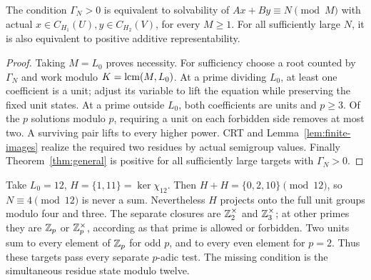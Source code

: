 \begin{theorem}\label{thm:local}
The condition \(\Gamma_N>0\) is equivalent to solvability of
\(Ax+By\equiv N\pmod M\) with actual
\(x\in C_{H_1}(U),y\in C_{H_2}(V)\), for every \(M\ge1\).
For all sufficiently large \(N\), it is also equivalent to positive
additive representability.
\end{theorem}
\begin{proof}
Taking \(M=L_0\) proves necessity. For sufficiency choose a root
counted by \(\Gamma_N\) and work modulo \(K=\operatorname{lcm}(M,L_0)\).
At a prime dividing \(L_0\), at least one coefficient is a unit;
adjust its variable to lift the equation while preserving the fixed
unit states. At a prime outside \(L_0\), both coefficients are units
and \(p\ge3\). Of the \(p\) solutions modulo \(p\), requiring a
unit on each forbidden side removes at most two. A surviving pair
lifts to every higher power. CRT and Lemma~\ref{lem:finite-images}
realize the required two residues by actual semigroup values.
Finally Theorem~\ref{thm:general} is positive for all sufficiently
large targets with \(\Gamma_N>0\).
\end{proof}

\begin{remark}\label{rem:coupled}
Take \(L_0=12\), \(H=\{1,11\}=\ker\chi_{12}\).
Then \(H+H=\{0,2,10\}\pmod{12}\), so \(N\equiv4\pmod{12}\)
is never a sum. Nevertheless \(H\) projects onto the full unit groups
modulo four and three. The separate closures are \(\mathbb Z_2^\times\)
and \(\mathbb Z_3^\times\); at other primes they are \(\mathbb Z_p\) or
\(\mathbb Z_p^\times\), according as that prime is allowed or forbidden.
Two units sum to every element of \(\mathbb Z_p\) for odd \(p\), and to
every even element for \(p=2\). Thus these targets pass every
separate \(p\)-adic test. The missing condition is the simultaneous
residue state modulo twelve.
\end{remark}

